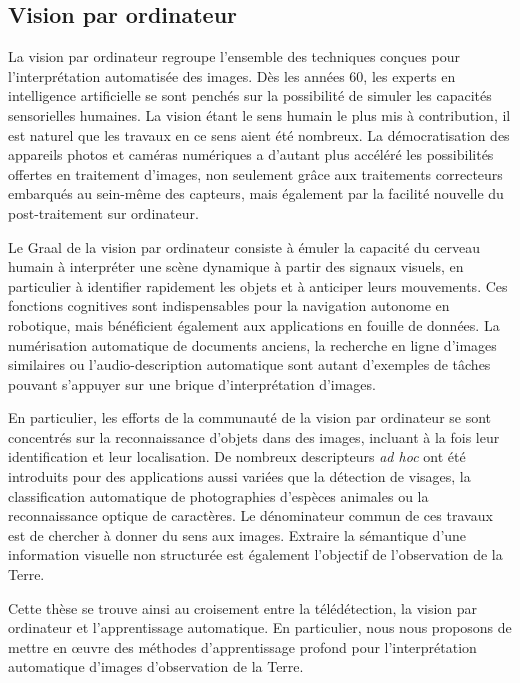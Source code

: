 \subsection{Vision par ordinateur}

La vision par ordinateur regroupe l'ensemble des techniques conçues pour l'interprétation automatisée des images. Dès les années 60, les experts en intelligence artificielle se sont penchés sur la possibilité de simuler les capacités sensorielles humaines. La vision étant le sens humain le plus mis à contribution, il est naturel que les travaux en ce sens aient été nombreux. La démocratisation des appareils photos et caméras numériques a d'autant plus accéléré les possibilités offertes en traitement d'images, non seulement grâce aux traitements correcteurs embarqués au sein-même des capteurs, mais également par la facilité nouvelle du post-traitement sur ordinateur.

Le Graal de la vision par ordinateur consiste à émuler la capacité du cerveau humain à interpréter une scène dynamique à partir des signaux visuels, en particulier à identifier rapidement les objets et à anticiper leurs mouvements. Ces fonctions cognitives sont indispensables pour la navigation autonome en robotique, mais bénéficient également aux applications en fouille de données. La numérisation automatique de documents anciens, la recherche en ligne d'images similaires ou l'audio-description automatique sont autant d'exemples de tâches pouvant s'appuyer sur une brique d'interprétation d'images.

En particulier, les efforts de la communauté de la vision par ordinateur se sont concentrés sur la reconnaissance d'objets dans des images, incluant à la fois leur identification et leur localisation. De nombreux descripteurs \emph{ad hoc} ont été introduits pour des applications aussi variées que la détection de visages, la classification automatique de photographies d'espèces animales ou la reconnaissance optique de caractères. Le dénominateur commun de ces travaux est de chercher à donner du sens aux images. Extraire la sémantique d'une information visuelle non structurée est également l'objectif de l'observation de la Terre.

Cette thèse se trouve ainsi au croisement entre la télédétection, la vision par ordinateur et l'apprentissage automatique. En particulier, nous nous proposons de mettre en \oe{}uvre des méthodes d'apprentissage profond pour l'interprétation automatique d'images d'observation de la Terre.

